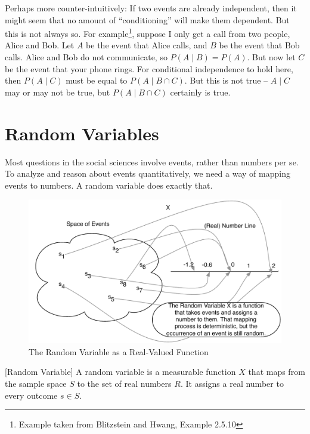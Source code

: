\documentclass[]{book}
\let\rmarkdownfootnote\footnote%
\def\footnote{\protect\rmarkdownfootnote}
\theoremstyle{definition}
\theoremstyle{definition}
\theoremstyle{definition}
\theoremstyle{remark}
\begin{document}
Perhaps more counter-intuitively: If two events are already independent, then it might seem that no amount of ``conditioning'' will make them dependent. But this is not always so. For example\footnote{Example taken from Blitzstein and Hwang, Example 2.5.10}, suppose I only get a call from two people, Alice and Bob. Let \(A\) be the event that Alice calls, and \(B\) be the event that Bob calls. Alice and Bob do not communicate, so \(P(A \mid B) = P(A).\) But now let \(C\) be the event that your phone rings. For conditional independence to hold here, then \(P(A \mid C)\) must be equal to \(P(A \mid B \cap C).\) But this is not true -- \(A \mid C\) may or may not be true, but \(P(A \mid B \cap C)\) certainly is true.

\hypertarget{random-variables}{%
\section{Random Variables}\label{random-variables}}

Most questions in the social sciences involve events, rather than numbers per se. To analyze and reason about events quantitatively, we need a way of mapping events to numbers. A random variable does exactly that.

\begin{figure}
\centering
\includegraphics{images/rv.pdf}
\caption{\label{fig:rv-image}The Random Variable as a Real-Valued Function}
\end{figure}

[Random Variable]
\protect\hypertarget{def:unnamed-chunk-71}{}{\label{def:unnamed-chunk-71} {} }
A random variable is a measurable function \(X\) that maps from the sample space \(S\) to the set of real numbers \(R.\) It assigns a real number to every outcome \(s \in S\).
\end{document}
